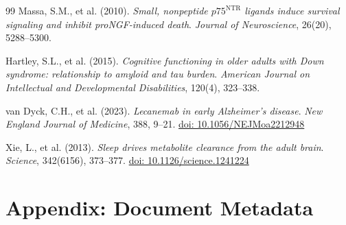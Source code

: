 \documentclass[12pt,a4paper]{article}
\begin{document}
\begin{thebibliography}{99}
Massa, S.M., et al. (2010).
\textit{Small, nonpeptide $p75^{\mathrm{NTR}}$
ligands induce survival signaling and inhibit
proNGF-induced death}.
\textit{Journal of Neuroscience}, 26(20), 5288--5300.

Hartley, S.L., et al. (2015).
\textit{Cognitive functioning in older adults with
Down syndrome: relationship to amyloid and tau burden}.
\textit{American Journal on Intellectual and
Developmental Disabilities}, 120(4), 323--338.

van Dyck, C.H., et al. (2023).
\textit{Lecanemab in early Alzheimer's disease}.
\textit{New England Journal of Medicine}, 388, 9--21.
\href{https://doi.org/10.1056/NEJMoa2212948}
{doi: 10.1056/NEJMoa2212948}

Xie, L., et al. (2013).
\textit{Sleep drives metabolite clearance from
the adult brain}.
\textit{Science}, 342(6156), 373--377.
\href{https://doi.org/10.1126/science.1241224}
{doi: 10.1126/science.1241224}

\end{thebibliography}

\newpage
\section*{Appendix: Document Metadata}
\end{document}

